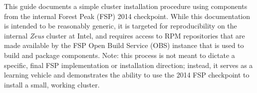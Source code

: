 This guide documents a simple cluster installation procedure using components
from the internal Forest Peak (FSP) 2014 checkpoint. While this documentation
is intended to be reasonably generic, it is targeted for reproducibility on the
internal {\em Zeus} cluster at Intel, and requires access to RPM repositories that are made
available by the FSP Open Build Service (OBS) instance that is used to build
and package components. Note: this process is not meant to dictate a
specific, final FSP implementation or installation direction; instead, it
serves as a learning vehicle and demonstrates the ability to use the 2014 FSP
checkpoint to install a small, working cluster.
